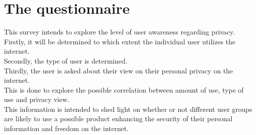 \noindent
\section{The questionnaire}
This survey intends to explore the level of user awareness regarding privacy. \\
Firstly, it will be determined to which extent the individual user utilizes the internet.\\ 
Secondly, the type of user is determined. \\
Thirdly, the user is asked about their view on their personal privacy on the internet.\\
This is done to explore the possible correlation between amount of use, type of use and privacy view. \\
This information is intended to shed light on whether or not different user groups are likely to use a possible product enhancing the security of their personal information and freedom on the internet.\\